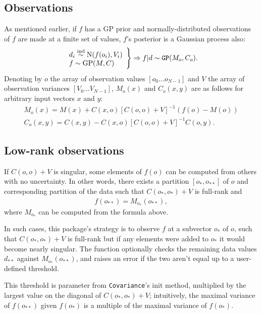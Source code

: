 \documentclass[]{manual}
\begin{document}
\subsection{Observations}
As mentioned earlier, if $f$ has a GP prior and normally-distributed observations of $f$ are made at a finite set of values, $f$'s posterior is a Gaussian process also:
\begin{eqnarray*}
    \left.\begin{array}{l}
        d_i \stackrel{\tiny{\textup{ind}}}{\sim} \textup{N}(f(o_i), V_i)\\
        f \sim \textup{GP}(M,C)
    \end{array}\right\}\Rightarrow f|d \sim \texttt{GP}(M_o, C_o).    
\end{eqnarray*}
Denoting by $o$ the array of observation values $[o_0\ldots o_{N-1}]$ and $V$ the array of observation variances $[V_0\ldots V_{N-1}]$, $M_o(x)$ and $C_o(x,y)$ are as follows for arbitrary input vectors $x$ and $y$:
\begin{eqnarray*}
    M_o(x) = M(x) + C(x,o)[C(o,o) + V]^{-1}(f(o)-M(o))\\
    C_o(x,y) = C(x,y) - C(x,o)[C(o,o) + V]^{-1}C(o,y).
\end{eqnarray*}

\subsection{Low-rank observations} 

If $C(o,o)+V$ is singular, some elements of $f(o)$ can be computed from others with no uncertainty. In other words, there exists a partition $[o_*, o_{**}]$ of $o$ and corresponding partition of the data such that $C(o_*,o_*)+V$ is full-rank and
\begin{eqnarray*}
    f(o_{**}) = M_{o_*}(o_{**}),
\end{eqnarray*}
where $M_{o_*}$ can be computed from the formula above.

In such cases, this package's strategy is to observe $f$ at a subvector $o_*$ of $o$, such that $C(o_*,o_*)+V$ is full-rank but if any elements were added to $o_*$ it would become nearly singular. The function  optionally checks the remaining data values $d_{**}$ against $M_{o_*}(o_{**})$, and raises an error if the two aren't equal up to a user-defined threshold. 

This threshold is parameter  from \texttt{Covariance}'s init method, multiplied by the largest value on the diagonal of $C(o_*,o_*)+V$; intuitively, the maximal variance of $f(o_{**})$ given $f(o_*)$ is a multiple of the maximal variance of $f(o_*)$.
\end{document}

